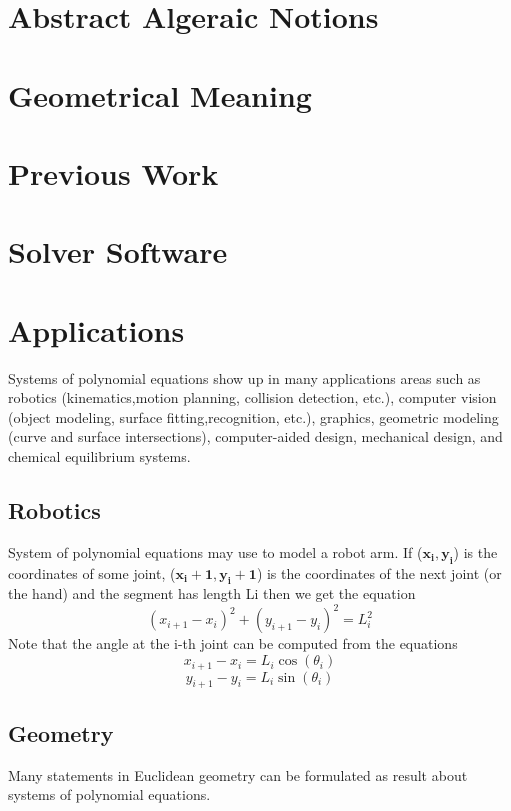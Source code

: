 \documentclass[11pt]{article}
\begin{document}
\section{Abstract Algeraic Notions}

\section{Geometrical Meaning}


\section{Previous Work}

 
\section{Solver Software}

\section{Applications}
Systems of polynomial equations show up in many applications areas such as robotics (kinematics,motion planning, collision detection, etc.), computer vision (object modeling, surface fitting,recognition, etc.), graphics, geometric modeling (curve and surface intersections), computer-aided design, mechanical design, and chemical equilibrium systems. \cite{yanbinjiaArticle}
\subsection{Robotics}
System of polynomial equations may use to model a robot arm. If  ($\mathbf{x_i, y_i}$) is the coordinates of some joint,  ($\mathbf{x_i+1, y_i+1}$) is the coordinates of the next joint (or the hand) and the segment has length Li then we get the equation \cite{richterArticle} 
 \begin{equation} 
    (x_{i+1}-x_i)^2 + (y_{i+1}-y_i)^2=L_i^2
\end{equation}
Note that the angle at the i-th joint can be computed from the equations
 \begin{equation} 
    x_{i+1}-x_i = L_i \cos(\theta_i)
\end{equation}
 \begin{equation} 
    y_{i+1}-y_i = L_i \sin(\theta_i)
\end{equation}

\subsection{Geometry}
Many statements in Euclidean geometry can be formulated as result about systems of polynomial equations.\cite{richterArticle} 
\end{document}
